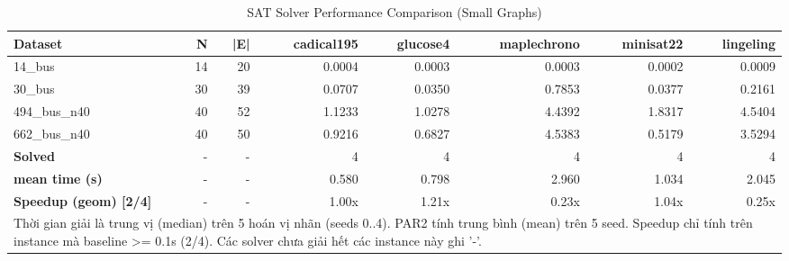 \begin{table}[htbp]
\centering
\caption{SAT Solver Performance Comparison (Small Graphs)}
\label{tab:table_solvers_small}
\begin{tabular}{lrrrrrrr}
\toprule
Dataset & N & |E| & cadical195 & glucose4 & maplechrono & minisat22 & lingeling \\
\midrule
14\_bus & 14 & 20 & 0.0004 & 0.0003 & 0.0003 & 0.0002 & 0.0009 \\
30\_bus & 30 & 39 & 0.0707 & 0.0350 & 0.7853 & 0.0377 & 0.2161 \\
494\_bus\_n40 & 40 & 52 & 1.1233 & 1.0278 & 4.4392 & 1.8317 & 4.5404 \\
662\_bus\_n40 & 40 & 50 & 0.9216 & 0.6827 & 4.5383 & 0.5179 & 3.5294 \\
\midrule
\textbf{Solved} & - & - & 4 & 4 & 4 & 4 & 4 \\
\textbf{mean time (s)} & - & - & 0.580 & 0.798 & 2.960 & 1.034 & 2.045 \\
\textbf{Speedup (geom) [2/4]} & - & - & 1.00x & 1.21x & 0.23x & 1.04x & 0.25x \\
\bottomrule
\multicolumn{8}{l}{\footnotesize Thời gian giải là trung vị (median) trên 5 hoán vị nhãn (seeds 0..4). PAR2 tính trung bình (mean) trên 5 seed. Speedup chỉ tính trên instance mà baseline >= 0.1s (2/4). Các solver chưa giải hết các instance này ghi '-'.} \\
\end{tabular}
\end{table}
